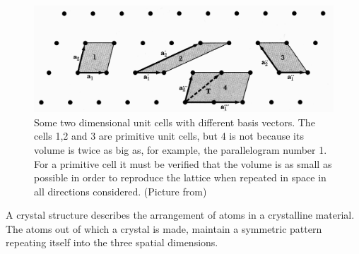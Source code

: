 	\FloatBarrier
	\begin{figure}[b!]
		\centering
		\includegraphics[width=.9\linewidth]{andere_bilder/basis_2dim.png}
		\caption{Some two dimensional unit cells with different basis vectors. The cells 1,2 and 3 are primitive unit cells, but 4 
		is not because its volume is twice as big as, for example, the parallelogram number 1. For a primitive cell it must be verified that the volume is as small as possible in order to reproduce the lattice when repeated in space in all directions considered. 
		(Picture from\cite{Kittel})}\label{basis_2dim}
	\end{figure}

	A crystal structure describes the arrangement of atoms in a crystalline material. The atoms out of which a crystal is made, maintain a symmetric pattern repeating itself into the three spatial dimensions. 
	
